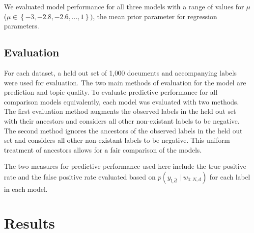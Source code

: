 \documentclass{article}
\begin{document}
We evaluated model performance for all three models with a range of
values for $\mu$ ($\mu\in\left\{ -3,-2.8,-2.6,\ldots,1\right\} )$,
the mean prior parameter for regression parameters.


\subsection{Evaluation}

For each dataset, a held out set of 1,000 documents and accompanying
labels were used for evaluation. The two main methods of evaluation
for the model are prediction and topic quality. To evaluate predictive
performance for all comparison models equivalently, each model was
evaluated with two methods. The first evaluation method augments the
observed labels in the held out set with their ancestors and considers
all other non-existant labels to be negative. The second method ignores
the ancestors of the observed labels in the held out set and considers
all other non-existant labels to be negative. This uniform treatment
of ancestors allows for a fair comparison of the models.

The two measures for predictive performance used here include the
true positive rate and the false positive rate evaluated based on
$p\left(y_{l,\hat{d}}\mid w_{1:N,d}\right)$ for each label in each
model.

\section{Results}
\label{sec:results}
\end{document}
